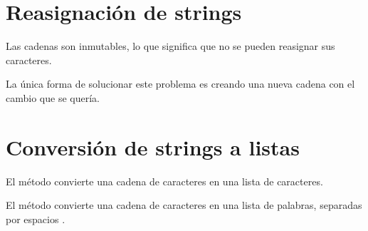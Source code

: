 \section{Reasignación de strings}

Las cadenas son inmutables, lo que significa que no se pueden reasignar sus caracteres.


La única forma de solucionar este problema es creando una nueva cadena con el cambio que se quería.


\section{Conversión de strings a listas}

El método  convierte una cadena de caracteres en una lista de caracteres.


El método  convierte una cadena de caracteres en una lista de palabras, separadas por espacios \ttt{\qq  \qq}.


\clearpage